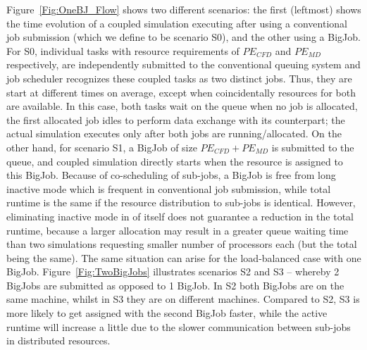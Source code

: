\documentclass[conference,final]{IEEEtran}
\begin{document}
Figure~\ref{Fig:OneBJ_Flow} shows two different scenarios: the first
(leftmost) shows the time evolution of a coupled simulation executing
after using a conventional job submission (which we define to be
scenario S0), and the other using a BigJob. For S0, individual tasks
with resource requirements of $PE_{CFD}$ and $PE_{MD}$ respectively,
are independently submitted to the conventional queuing system and job
scheduler recognizes these coupled tasks as two distinct jobs. Thus,
they are start at different times on average, except when
coincidentally resources for both are available. In this case, both
tasks wait on the queue when no job is allocated, the first allocated
job idles to perform data exchange with its counterpart; the actual
simulation executes only after both jobs are running/allocated. On the
other hand, for scenario S1, a BigJob of size $PE_{CFD}+PE_{MD}$ is
submitted to the queue, and coupled simulation directly starts when
the resource is assigned to this BigJob. Because of co-scheduling of
sub-jobs, a BigJob is free from long inactive mode which is frequent
in conventional job submission, while total runtime is the same if the
resource distribution to sub-jobs is identical. However, eliminating
inactive mode in of itself does not guarantee a reduction in the total
runtime, because a larger allocation may result in a greater queue
waiting time than two simulations requesting smaller number of
processors each (but the total being the same). The same situation can
arise for the load-balanced case with one BigJob. %
Figure~\ref{Fig:TwoBigJobs} illustrates scenarios S2 and S3 -- whereby
2 BigJobs are submitted as opposed to 1 BigJob. In S2 both BigJobs are
on the same machine, whilst in S3 they are on different machines. 
Compared to S2, S3 is more likely to get assigned with the second BigJob faster, while the active runtime will increase a little due to the slower communication between sub-jobs in distributed resources.
\end{document}
